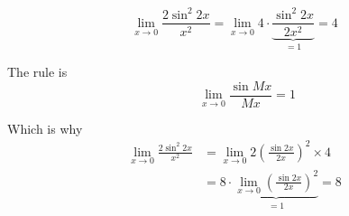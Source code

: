 \documentclass[14pt,fleqn]{extarticle}
\begin{document}
 
\begin{snippet}
    
    \incorrect
    \[ \lim_{x\to 0} \frac{2\sin^2 2x}{x^2} = \lim_{x\to 0} 4\cdot \underbrace{\frac{\sin^2 2x}{2x^2}}_{= 1} = 4\]
    \reason
    
    The rule is 
    \[ \qquad \lim_{x\to 0} \frac{\sin Mx}{Mx} = 1 \]
     
    Which is why 
    \begin{align}
	\lim_{x\to 0} \frac{2\sin^2 2x}{x^2} &= \lim_{x\to 0} 2 \left(\frac{\sin 2x}{2x} \right)^2\times 4 \\
	&= 8\cdot \underbrace{\lim_{x\to 0} \left(\frac{\sin 2x}{2x} \right)^2}_{=1} = 8 
\end{align}
    
\end{snippet} 
\end{document}
